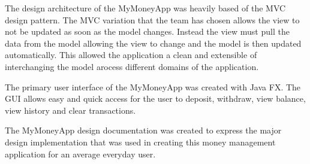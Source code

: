 \documentclass[12pt]{article}
\begin{document}
The design architecture of the MyMoneyApp was heavily based of the MVC design pattern. The MVC variation that the team has chosen allows the view to not be updated as soon as the model changes. Instead the view must pull the data from the model allowing the view to change and the model is then updated automatically. This allowed the application a clean and extensible of interchanging the model arocess different domains of the application.

The primary user interface of the MyMoneyApp was created with Java FX. The GUI allows easy and quick access for the user to deposit, withdraw, view balance, view history and clear transactions. 

The MyMoneyApp design documentation was created to express the major design implementation that was used in creating this money management application for an average everyday user.
\end{document}
